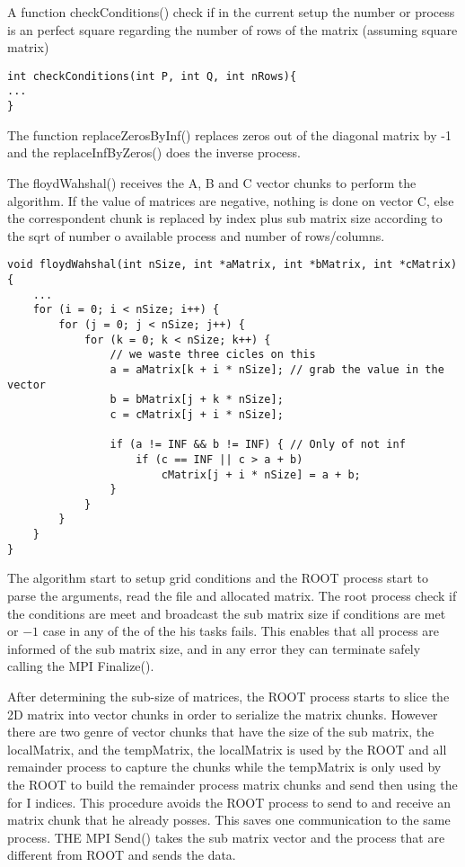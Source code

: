 \documentclass[10pt,a4paper,final]{report}
\begin{document}
A function checkConditions() check if in the current setup the number or process is an perfect square regarding the number of rows of the matrix (assuming square matrix)
\begin{lstlisting}
int checkConditions(int P, int Q, int nRows){
...
}
\end{lstlisting}

The function replaceZerosByInf() replaces zeros out of the diagonal matrix by -1 and the replaceInfByZeros() does the inverse process.

The floydWahshal() receives the A, B and C vector chunks to perform the algorithm. If the value of matrices are negative, nothing is done on vector C, else the correspondent chunk is replaced by index plus sub matrix size according to the sqrt of number o available process and number of rows/columns.
\begin{lstlisting}
void floydWahshal(int nSize, int *aMatrix, int *bMatrix, int *cMatrix) {
	...
	for (i = 0; i < nSize; i++) {
		for (j = 0; j < nSize; j++) {
			for (k = 0; k < nSize; k++) {
				// we waste three cicles on this
				a = aMatrix[k + i * nSize]; // grab the value in the vector
				b = bMatrix[j + k * nSize];
				c = cMatrix[j + i * nSize];

				if (a != INF && b != INF) { // Only of not inf
					if (c == INF || c > a + b)
						cMatrix[j + i * nSize] = a + b;
				}
			}
		}
	}
}
\end{lstlisting}


The algorithm start to setup grid conditions and the ROOT process start to parse the arguments, read the file and allocated matrix. The root process check if the conditions are meet and broadcast the sub matrix size if conditions are met or $-1$ case in any of the of the his tasks fails. This enables that all process are informed of the sub matrix size, and in any error they can terminate safely calling the MPI Finalize().

After determining the sub-size of matrices, the ROOT process starts to slice the 2D matrix into vector chunks in order to serialize the matrix chunks. However there are two genre of vector chunks that have the size of the sub matrix, the localMatrix, and the tempMatrix, the localMatrix is used by the ROOT and all remainder process to capture the chunks while the tempMatrix is only used by the ROOT to build the remainder process matrix chunks and send then using the for I indices. This procedure avoids the ROOT process to send to and receive an matrix chunk that he already posses. This saves one communication to the same process. THE MPI Send() takes the sub matrix vector and the process that are different from ROOT and sends the data.
\end{document}

